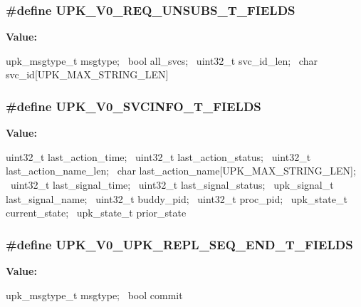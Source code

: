 \subsubsection[{UPK\_\-V0\_\-REQ\_\-UNSUBS\_\-T\_\-FIELDS}]{\setlength{\rightskip}{0pt plus 5cm}\#define UPK\_\-V0\_\-REQ\_\-UNSUBS\_\-T\_\-FIELDS}\label{upk__v0__protocol__structs_8h_a2b6288d2c66ef74a6650ef44cc044189}
{\bfseries Value:}
\begin{DoxyCode}
upk_msgtype_t       msgtype; \
    bool                    all_svcs; \
    uint32_t                svc_id_len; \
    char                    svc_id[UPK_MAX_STRING_LEN]
\end{DoxyCode}
\subsubsection[{UPK\_\-V0\_\-SVCINFO\_\-T\_\-FIELDS}]{\setlength{\rightskip}{0pt plus 5cm}\#define UPK\_\-V0\_\-SVCINFO\_\-T\_\-FIELDS}\label{upk__v0__protocol__structs_8h_acccca258049c0a041c3e20291266bc79}
{\bfseries Value:}
\begin{DoxyCode}
uint32_t                last_action_time; \
    uint32_t                last_action_status; \
    uint32_t                last_action_name_len; \
    char                    last_action_name[UPK_MAX_STRING_LEN]; \
    uint32_t                last_signal_time; \
    uint32_t                last_signal_status; \
    upk_signal_t            last_signal_name; \
    uint32_t                buddy_pid; \
    uint32_t                proc_pid; \
    upk_state_t             current_state; \
    upk_state_t             prior_state
\end{DoxyCode}
\subsubsection[{UPK\_\-V0\_\-UPK\_\-REPL\_\-SEQ\_\-END\_\-T\_\-FIELDS}]{\setlength{\rightskip}{0pt plus 5cm}\#define UPK\_\-V0\_\-UPK\_\-REPL\_\-SEQ\_\-END\_\-T\_\-FIELDS}\label{upk__v0__protocol__structs_8h_a3ed27dd7d93ecf5d795930425868cb19}
{\bfseries Value:}
\begin{DoxyCode}
upk_msgtype_t      msgtype; \
    bool                    commit
\end{DoxyCode}
